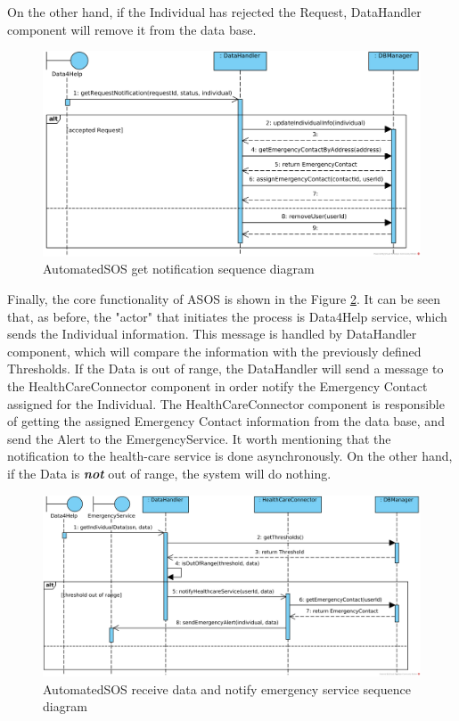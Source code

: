 \documentclass[a4paper, hidelinks, 12pt]{report}
\begin{document}
	On the other hand, if the Individual has rejected the Request, DataHandler component will remove it from the data base.
	\begin{figure}[H]
		\centering
		\includegraphics[width=1\textwidth]{diagrams/sequence_diagrams/asos_get_individual_notification.png}
		\caption[AutomatedSOS get notification sequence diagram]{AutomatedSOS get notification sequence diagram}
		\label{fig:asos_seq_get_notification}
	\end{figure}
	
	Finally, the core functionality of ASOS is shown in the Figure \ref{fig:asos_seq_receive_data}. It can be seen that, as before, the "actor" that initiates the process is Data4Help service, which sends the Individual information. This message is handled by DataHandler component, which will compare the information with the previously defined Thresholds. If the Data is out of range, the DataHandler will send a message to the HealthCareConnector component in order notify the Emergency Contact assigned for the Individual. The HealthCareConnector component is responsible of getting the assigned Emergency Contact information from the data base, and send the Alert to the EmergencyService. It worth mentioning that the notification to the health-care service is done asynchronously. On the other hand, if the Data is \textit{\textbf{not}} out of range, the system will do nothing.
	
	\begin{figure}[H]
		\centering
		\includegraphics[width=1\textwidth]{diagrams/sequence_diagrams/asos_receive_individual_data_and_notify_emergency_service.png}
		\caption[AutomatedSOS receive data and notify emergency service sequence diagram]{AutomatedSOS receive data and notify emergency service sequence diagram}
		\label{fig:asos_seq_receive_data}
	\end{figure}
	
\end{document}
